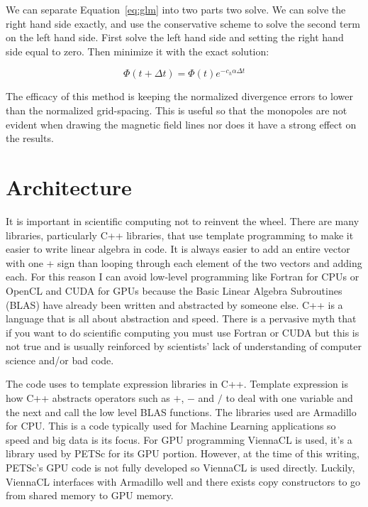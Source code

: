 \documentclass[12pt,upcase]{umlthesis}
\begin{document}
We can separate Equation~\ref{eq:glm} into two parts two solve. We can solve the right hand side exactly, and use the conservative scheme to solve the second term on the left hand side. First solve the left hand side and setting the right hand side equal to zero. Then minimize it with the exact solution:

\begin{equation}
	\Phi(t+\Delta t) = \Phi(t) e^{-c_h\alpha\Delta t}
\end{equation}

The efficacy of this method is keeping the normalized divergence errors to lower than the normalized grid-spacing. This is useful so that the monopoles are not evident when drawing the magnetic field lines nor does it have a strong effect on the results.

\section{Architecture}\label{sec:architecture}

It is important in scientific computing not to reinvent the wheel. There are many libraries, particularly C++ libraries, that use template programming to make it easier to write linear algebra in code. It is always easier to add an entire vector with one + sign than looping through each element of the two vectors and adding each. For this reason I can avoid low-level programming like Fortran for CPUs or OpenCL and CUDA for GPUs because the Basic Linear Algebra Subroutines (BLAS) have already been written and abstracted by someone else. C++ is a language that is all about abstraction and speed. There is a pervasive myth that if you want to do scientific computing you must use Fortran or CUDA but this is not true and is usually reinforced by scientists' lack of understanding of computer science and/or bad code.

The code uses to template expression libraries in C++. Template expression is how C++ abstracts operators such as $+$, $-$ and $/$ to deal with one variable and the next and call the low level BLAS functions. The libraries used are Armadillo for CPU\@. This is a code typically used for Machine Learning applications so speed and big data is its focus. For GPU programming ViennaCL is used, it's a library used by PETSc for its GPU portion. However, at the time of this writing, PETSc's GPU code is not fully developed so ViennaCL is used directly. Luckily, ViennaCL interfaces with Armadillo well and there exists copy constructors to go from shared memory to GPU memory.
\end{document}
